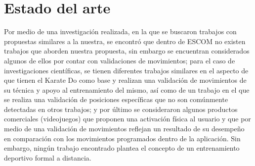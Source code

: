 \section{Estado del arte}
Por medio de una investigación realizada, en la que se buscaron trabajos con propuestas similares a la nuestra, se encontró que dentro de ESCOM no existen trabajos que aborden nuestra propuesta, sin embargo se encuentran considerados algunos de ellos por contar con validaciones de movimientos; para el caso de investigaciones científicas, se tienen diferentes trabajos similares en el aspecto de que tienen el Karate Do como base y realizan una validación de movimientos de su técnica y apoyo al entrenamiento del mismo, así como de un trabajo en el que se realiza una validación de posiciones específicas que no son comúnmente detectadas en otros trabajos; y por último se consideraron algunos productos comerciales (videojuegos) que proponen una activación física al usuario y que por medio de una validación de movimientos reflejan un resultado de su desempeño en comparación con los movimientos programados dentro de la aplicación. Sin embargo, ningún trabajo encontrado plantea el concepto de un entrenamiento deportivo formal a distancia.\\

